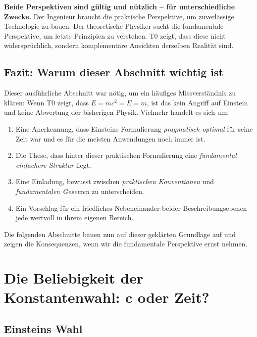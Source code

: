 	\textbf{Beide Perspektiven sind gültig und nützlich – für unterschiedliche Zwecke.} Der Ingenieur braucht die praktische Perspektive, um zuverlässige Technologie zu bauen. Der theoretische Physiker sucht die fundamentale Perspektive, um letzte Prinzipien zu verstehen. T0 zeigt, dass diese nicht widersprüchlich, sondern komplementäre Ansichten derselben Realität sind.
	
	\subsection{Fazit: Warum dieser Abschnitt wichtig ist}
	
	Dieser ausführliche Abschnitt war nötig, um ein häufiges Missverständnis zu klären: Wenn T0 zeigt, dass \( E = mc^2 = E = m \), ist das kein Angriff auf Einstein und keine Abwertung der bisherigen Physik. Vielmehr handelt es sich um:
	
	\begin{enumerate}
		\item Eine Anerkennung, dass Einsteins Formulierung \textit{pragmatisch optimal} für seine Zeit war und es für die meisten Anwendungen noch immer ist.
		
		\item Die These, dass hinter dieser praktischen Formulierung eine \textit{fundamental einfachere Struktur} liegt.
		
		\item Eine Einladung, bewusst zwischen \textit{praktischen Konventionen} und \textit{fundamentalen Gesetzen} zu unterscheiden.
		
		\item Ein Vorschlag für ein friedliches Nebeneinander beider Beschreibungsebenen – jede wertvoll in ihrem eigenen Bereich.
	\end{enumerate}
	
	Die folgenden Abschnitte bauen nun auf dieser geklärten Grundlage auf und zeigen die Konsequenzen, wenn wir die fundamentale Perspektive ernst nehmen.
	
	\section{Die Beliebigkeit der Konstantenwahl: c oder Zeit?}
	
	\subsection{Einsteins Wahl}
	

